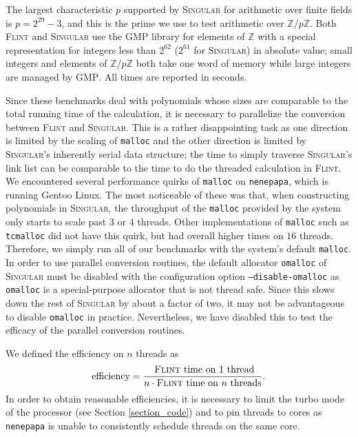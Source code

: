 \documentclass{deliverablereport}
\begin{document}
The largest characteristic $p$ supported by \textsc{Singular} for arithmetic over finite fields is $p = 2^{29}-3$, and this is the prime we use to test arithmetic over $\mathbb{Z}/p \mathbb{Z}$. Both \textsc{Flint} and \textsc{Singular} use the \textsc{GMP} library for elements of $\mathbb{Z}$ with a special representation for integers less than $2^{62}$ ($2^{61}$ for \textsc{Singular}) in absolute value; small integers and elements of $\mathbb{Z}/p \mathbb{Z}$ both take one word of memory while large integers are managed by \textsc{GMP}. All times are reported in seconds.

Since these benchmarks deal with polynomials whose sizes are comparable to the total running time of the calculation, it is necessary to parallelize the conversion between \textsc{Flint} and \textsc{Singular}. This is a rather disappointing task as one direction is limited by the scaling of {\tt malloc} and the other direction is limited by \textsc{Singular}'s inherently serial data structure; the time to simply traverse \textsc{Singular}'s link list can be comparable to the time to do the threaded calculation in \textsc{Flint}. We encountered several performance quirks of {\tt malloc} on {\tt nenepapa}, which is running Gentoo Linux. The most noticeable of these was that, when constructing polynomials in \textsc{Singular}, the throughput of the {\tt malloc} provided by the system only starts to scale past $3$ or $4$ threads. Other implementations of {\tt malloc} such as {\tt tcmalloc} did not have this quirk, but had overall higher times on $16$ threads. Therefore, we simply run all of our benchmarks with the system's default {\tt malloc}. In order to use parallel conversion routines, the default allocator {\tt omalloc} of \textsc{Singular} must be disabled with the configuration option {\tt --disable-omalloc} as {\tt omalloc} is a special-purpose allocator that is not thread safe. Since this slows down the rest of \textsc{Singular} by about a factor of two, it may not be advantageous to disable {\tt omalloc} in practice. Nevertheless, we have disabled this to test the efficacy of the parallel conversion routines. 

We defined the efficiency on $n$ threads as
\begin{equation*}
\text{efficiency} = \frac{\text{ \textsc{Flint} time on $1$ thread}}{n \cdot \text{\textsc{Flint} time on $n$ threads}}\text{.}
\end{equation*}
In order to obtain reasonable efficiencies, it is necessary to limit the turbo mode of the processor (see Section \ref{section_code}) and to pin threads to cores as {\tt nenepapa} is unable to consistently schedule threads on the same core.
\end{document}
